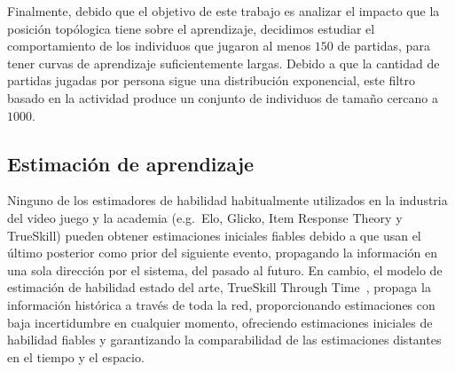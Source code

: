 \documentclass[a4paper,11pt]{book}
\theoremstyle{definition}
\begin{document}

Finalmente, debido que el objetivo de este trabajo es analizar el impacto que la posición topólogica tiene sobre el aprendizaje, decidimos estudiar el comportamiento de los individuos que jugaron al menos $150$ de partidas, para tener curvas de aprendizaje suficientemente largas.
%
Debido a que la cantidad de partidas jugadas por persona sigue una distribución exponencial, este filtro basado en la actividad produce un conjunto de individuos de tamaño cercano a $1000$.


\subsection{Estimación de aprendizaje}
Ninguno de los estimadores de habilidad habitualmente utilizados en la industria del video juego y la academia (e.g.~Elo, Glicko, Item Response Theory y TrueSkill) pueden obtener estimaciones iniciales fiables debido a que usan el último posterior como prior del siguiente evento, propagando la información en una sola dirección por el sistema, del pasado al futuro.
%
En cambio, el modelo de estimación de habilidad estado del arte, TrueSkill Through Time~\cite{Landfried2021-TTT, Dangauthier2007}, propaga la información histórica a través de toda la red, proporcionando estimaciones con baja incertidumbre en cualquier momento, ofreciendo estimaciones iniciales de habilidad fiables y garantizando la comparabilidad de las estimaciones distantes en el tiempo y el espacio.
\end{document}
